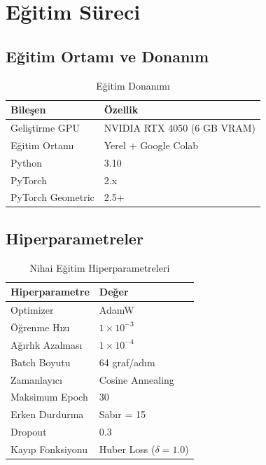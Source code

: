 \documentclass[conference]{IEEEtran}
\begin{document}
\section{Eğitim Süreci}

\subsection{Eğitim Ortamı ve Donanım}

\begin{table}[H]
  \centering
  \caption{Eğitim Donanımı}
  \label{tab:hardware}
  \begin{tabular}{ll}
    \toprule
    \textbf{Bileşen} & \textbf{Özellik} \\
    \midrule
    Geliştirme GPU & NVIDIA RTX 4050 (6 GB VRAM) \\
    Eğitim Ortamı & Yerel + Google Colab \\
    Python & 3.10 \\
    PyTorch & 2.x \\
    PyTorch Geometric & 2.5+ \\
    \bottomrule
  \end{tabular}
\end{table}

\subsection{Hiperparametreler}

\begin{table}[H]
  \centering
  \caption{Nihai Eğitim Hiperparametreleri}
  \label{tab:hyperparams}
  \begin{tabular}{ll}
    \toprule
    \textbf{Hiperparametre} & \textbf{Değer} \\
    \midrule
    Optimizer & AdamW \\
    Öğrenme Hızı & $1 \times 10^{-3}$ \\
    Ağırlık Azalması & $1 \times 10^{-4}$ \\
    Batch Boyutu & 64 graf/adım \\
    Zamanlayıcı & Cosine Annealing \\
    Maksimum Epoch & 30 \\
    Erken Durdurma & Sabır = 15 \\
    Dropout & 0.3 \\
    Kayıp Fonksiyonu & Huber Loss ($\delta = 1.0$) \\
    \bottomrule
  \end{tabular}
\end{table}
\end{document}

